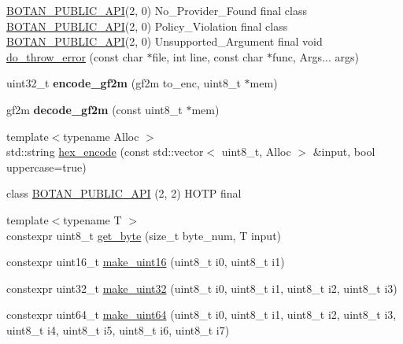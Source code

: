 \begin{DoxyCompactItemize}
\hyperlink{namespace_botan_a6b9388030d872e586a4655b776ac9501}{B\+O\+T\+A\+N\+\_\+\+P\+U\+B\+L\+I\+C\+\_\+\+A\+PI}(2, 0) No\+\_\+\+Provider\+\_\+\+Found final class \hyperlink{namespace_botan_a6b9388030d872e586a4655b776ac9501}{B\+O\+T\+A\+N\+\_\+\+P\+U\+B\+L\+I\+C\+\_\+\+A\+PI}(2, 0) Policy\+\_\+\+Violation final class \hyperlink{namespace_botan_a6b9388030d872e586a4655b776ac9501}{B\+O\+T\+A\+N\+\_\+\+P\+U\+B\+L\+I\+C\+\_\+\+A\+PI}(2, 0) Unsupported\+\_\+\+Argument final void \hyperlink{namespace_botan_ad7517b7e0788bc232f4a7d3426b4932f}{do\+\_\+throw\+\_\+error} (const char $\ast$file, int line, const char $\ast$func, Args... args)
\item 
\mbox{\label{namespace_botan_acc7ce066cb6c98ece3bfc7ed40ba665b}} 
uint32\+\_\+t {\bfseries encode\+\_\+gf2m} (gf2m to\+\_\+enc, uint8\+\_\+t $\ast$mem)
\item 
\mbox{\label{namespace_botan_ac67aa49c644e0c2e5c1a8ed30e6e319a}} 
gf2m {\bfseries decode\+\_\+gf2m} (const uint8\+\_\+t $\ast$mem)
\item 
{\footnotesize template$<$typename Alloc $>$ }\\std\+::string \hyperlink{namespace_botan_a02a63d270351924b382780ee6d5b80c3}{hex\+\_\+encode} (const std\+::vector$<$ uint8\+\_\+t, Alloc $>$ \&input, bool uppercase=true)
\item 
class \hyperlink{namespace_botan_af945fa6198fa0d818e398c3e50303ddf}{B\+O\+T\+A\+N\+\_\+\+P\+U\+B\+L\+I\+C\+\_\+\+A\+PI} (2, 2) H\+O\+TP final
\item 
{\footnotesize template$<$typename T $>$ }\\constexpr uint8\+\_\+t \hyperlink{namespace_botan_ad10dc938a651323dddbfe3c1e985774b}{get\+\_\+byte} (size\+\_\+t byte\+\_\+num, T input)
\item 
constexpr uint16\+\_\+t \hyperlink{namespace_botan_afa1f23105ed52b51390e214db16b6900}{make\+\_\+uint16} (uint8\+\_\+t i0, uint8\+\_\+t i1)
\item 
constexpr uint32\+\_\+t \hyperlink{namespace_botan_a690f1a5eaa98c00b71ef8320322e722e}{make\+\_\+uint32} (uint8\+\_\+t i0, uint8\+\_\+t i1, uint8\+\_\+t i2, uint8\+\_\+t i3)
\item 
constexpr uint64\+\_\+t \hyperlink{namespace_botan_a267c278fd265a2fc255df8b8de93dde2}{make\+\_\+uint64} (uint8\+\_\+t i0, uint8\+\_\+t i1, uint8\+\_\+t i2, uint8\+\_\+t i3, uint8\+\_\+t i4, uint8\+\_\+t i5, uint8\+\_\+t i6, uint8\+\_\+t i7)
\item 

\end{DoxyCompactItemize}
